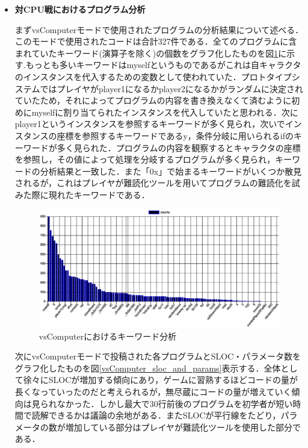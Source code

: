 \begin{itemize}
  \item {\bf 対CPU戦におけるプログラム分析}


  まずvsComputerモードで使用されたプログラムの分析結果について述べる．このモードで使用されたコードは合計327件である．全てのプログラムに含まれていたキーワード(演算子を除く)の個数をグラフ化したものを図\ref{vsComputer_keyword}に示す.もっとも多いキーワードはmyselfというものであるがこれは自キャラクタのインスタンスを代入するための変数として使われていた．プロトタイプシステムではプレイヤがplayer1になるかplayer2になるかがランダムに決定されていたため，それによってプログラムの内容を書き換えなくて済むように初めにmyselfに割り当てられたインスタンスを代入していたと思われる．次にplayer1というインスタンスを参照するキーワードが多く見られ，次いでインスタンスの座標を参照するキーワードであるy，条件分岐に用いられるifのキーワードが多く見られた．プログラムの内容を観察するとキャラクタの座標を参照し，その値によって処理を分岐するプログラムが多く見られ，キーワードの分析結果と一致した．また「0x」で始まるキーワードがいくつか散見されるが，これはプレイヤが難読化ツールを用いてプログラムの難読化を試みた際に現れたキーワードである．

  \begin{figure}[!ht]
    \begin{center}
      \includegraphics[width=1.0\linewidth]{image/vsComputer_result.eps}
    \end{center}
      \vspace{-8mm} 
    \caption{vsComputerにおけるキーワード分析}
    \label{vsComputer_keyword}
  \end{figure}

  次にvsComputerモードで投稿された各プログラムとSLOC・パラメータ数をグラフ化したものを図\ref{vsComputer_sloc_and_params}表示する．全体として徐々にSLOCが増加する傾向にあり，ゲームに習熟するほどコードの量が長くなっていったのだと考えられるが，無尽蔵にコードの量が増えていく傾向は見られなかった．しかし最大で30行前後のプログラムを初学者が短い時間で読解できるかは議論の余地がある．またSLOCが平行線をたどり，パラメータの数が増加している部分はプレイヤが難読化ツールを使用した部分である．



\end{itemize}
